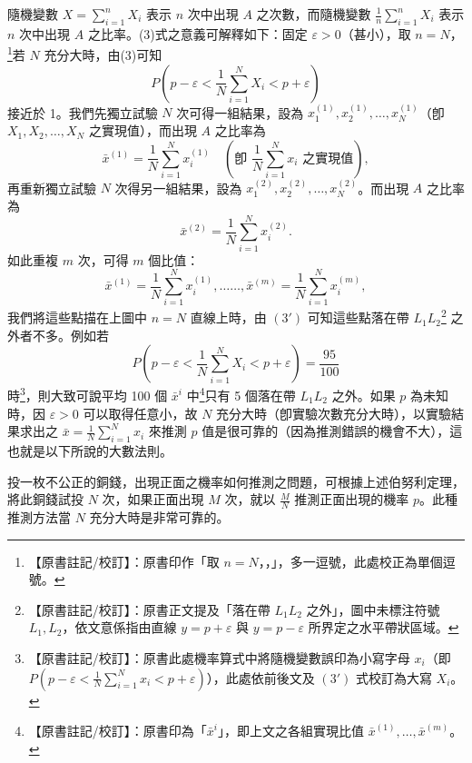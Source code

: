 隨機變數 $X = \sum_{i=1}^n X_i$ 表示 $n$ 次中出現 $A$ 之次數，而隨機變數 $\frac{1}{n}\sum_{i=1}^n X_i$ 表示 $n$ 次中出現 $A$ 之比率。(3)式之意義可解釋如下：固定 $\varepsilon > 0$（甚小），取 $n = N$，\label{note:b5-ch5-p164-comma}\footnote{【原書註記/校訂】：原書印作「取 $n = N$，，」，多一逗號，此處校正為單個逗號。}若 $N$ 充分大時，由(3)可知
\begin{equation}
P\left(p - \varepsilon < \frac{1}{N}\sum_{i=1}^N X_i < p + \varepsilon\right) \tag{$3'$}\label{eq:b5-5-3-3prime}
\end{equation}
接近於 1。我們先獨立試驗 $N$ 次可得一組結果，設為 $x_1^{(1)}, \allowbreak x_2^{(1)}, \allowbreak \dots, \allowbreak x_N^{(1)}$（卽 $X_1, \allowbreak X_2, \allowbreak \dots, \allowbreak X_N$ 之實現值），而出現 $A$ 之比率為
\[
\bar{x}^{(1)} = \frac{1}{N}\sum_{i=1}^N x_i^{(1)} \quad \left(\text{卽 } \frac{1}{N}\sum_{i=1}^N x_i \text{ 之實現值}\right),
\]
再重新獨立試驗 $N$ 次得另一組結果，設為 $x_1^{(2)}, x_2^{(2)}, \dots, x_N^{(2)}$。而出現 $A$ 之比率為
\[
\bar{x}^{(2)} = \frac{1}{N}\sum_{i=1}^N x_i^{(2)}.
\]
如此重複 $m$ 次，可得 $m$ 個比值：
\[
\bar{x}^{(1)} = \frac{1}{N}\sum_{i=1}^N x_i^{(1)}, \dots\dots, \bar{x}^{(m)} = \frac{1}{N}\sum_{i=1}^N x_i^{(m)},
\]
我們將這些點描在上圖中 $n = N$ 直線上時，由 $(3')$ 可知這些點落在帶 $L_1 L_2$\label{note:b5-ch5-p164-strip}\footnote{【原書註記/校訂】：原書正文提及「落在帶 $L_1 L_2$ 之外」，圖中未標注符號 $L_1, L_2$，依文意係指由直線 $y = p + \varepsilon$ 與 $y = p - \varepsilon$ 所界定之水平帶狀區域。} 之外者不多。例如若
\[
P\left(p - \varepsilon < \frac{1}{N}\sum_{i=1}^N X_i < p + \varepsilon\right) = \frac{95}{100}
\]
時\label{note:b5-ch5-p164-rv}\footnote{【原書註記/校訂】：原書此處機率算式中將隨機變數誤印為小寫字母 $x_i$（即 $P(p-\varepsilon < \frac{1}{N}\sum_{i=1}^N x_i < p+\varepsilon)$），此處依前後文及 $(3')$ 式校訂為大寫 $X_i$。}，則大致可說平均 100 個 $\bar{x}^i$ 中\label{note:b5-ch5-p164-xi}\footnote{【原書註記/校訂】：原書印為「$\bar{x}^i$」，即上文之各組實現比值 $\bar{x}^{(1)}, \dots, \bar{x}^{(m)}$。}只有 5 個落在帶 $L_1 L_2$ 之外。如果 $p$ 為未知時，因 $\varepsilon > 0$ 可以取得任意小，故 $N$ 充分大時（卽實驗次數充分大時），以實驗結果求出之 $\bar{x} = \frac{1}{N}\sum_{i=1}^N x_i$ 來推測 $p$ 值是很可靠的（因為推測錯誤的機會不大），這也就是以下所說的大數法則。

\medskip
\begin{discussion}\label{disc:b5-5-2}
投一枚不公正的銅錢，出現正面之機率如何推測之問題，可根據上述伯努利定理，將此銅錢試投 $N$ 次，如果正面出現 $M$ 次，就以 $\frac{M}{N}$ 推測正面出現的機率 $p$。此種推測方法當 $N$ 充分大時是非常可靠的。
\end{discussion}

